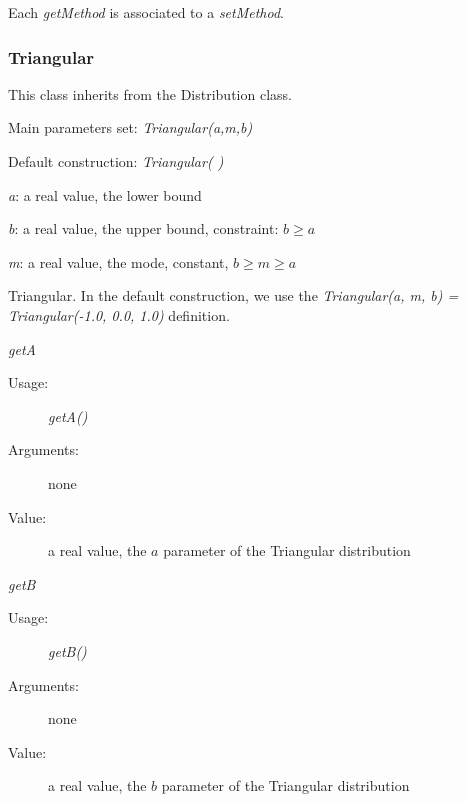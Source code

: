 Each  \textit{getMethod}  is associated to a \textit{setMethod}.




\newpage
\subsubsection{Triangular}

This class inherits from the Distribution class.

\begin{description}

\item[Usage:] \rule{0pt}{1em}
\begin{description}
\item Main parameters set: \textit{Triangular(a,m,b)}
\item Default construction: \textit{Triangular( )}
\end{description}

\item[Arguments:]  \rule{0pt}{1em}
\begin{description}
\item \textit{a}: a  real value, the lower bound
\item \textit{b}: a real value, the upper bound, constraint: $b\geq a$
\item \textit{m}: a real value, the mode, constant, $b\geq m \geq a$
\end{description}

\item[Value:] Triangular. In the default construction, we use the \textit{Triangular(a, m, b) = Triangular(-1.0, 0.0, 1.0)} definition.

\item[Some methods:] \rule{0pt}{1em}
\begin{description}

\item \textit{getA}
\begin{description}
\item[Usage:] \textit{getA()}
\item[Arguments:] none
\item[Value:]  a real value,  the $a$ parameter of the Triangular distribution
\end{description}
\bigskip

\item \textit{getB}
\begin{description}
\item[Usage:] \textit{getB()}
\item[Arguments:] none
\item[Value:]  a real value,  the $b$ parameter of the Triangular distribution
\end{description}
\bigskip


\end{description}
\end{description}
